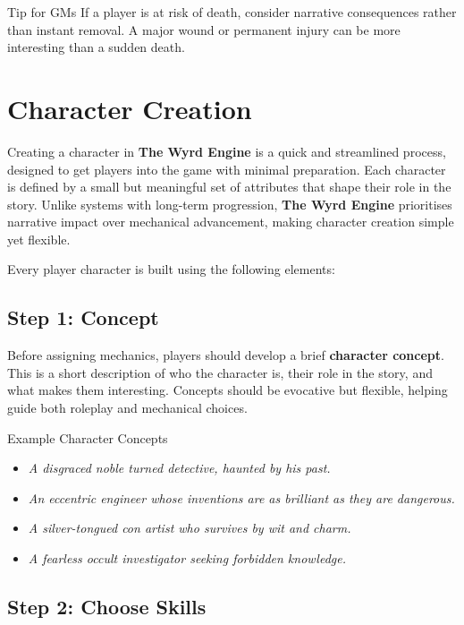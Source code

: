 \begin{DndComment}{Tip for GMs}
If a player is at risk of death, consider narrative consequences rather than instant removal. A major wound or permanent injury can be more interesting than a sudden death.
\end{DndComment}


\section{Character Creation}

Creating a character in \textbf{The Wyrd Engine} is a quick and streamlined process, designed to get players into the game with minimal preparation. Each character is defined by a small but meaningful set of attributes that shape their role in the story. Unlike systems with long-term progression, \textbf{The Wyrd Engine} prioritises narrative impact over mechanical advancement, making character creation simple yet flexible.

Every player character is built using the following elements:

\subsection{Step 1: Concept}

Before assigning mechanics, players should develop a brief \textbf{character concept}. This is a short description of who the character is, their role in the story, and what makes them interesting. Concepts should be evocative but flexible, helping guide both roleplay and mechanical choices.

\begin{DndSidebar}[float=!t]{Example Character Concepts}
    \begin{itemize}
        \item \emph{A disgraced noble turned detective, haunted by his past.}
        \item \emph{An eccentric engineer whose inventions are as brilliant as they are dangerous.}
        \item \emph{A silver-tongued con artist who survives by wit and charm.}
        \item \emph{A fearless occult investigator seeking forbidden knowledge.}
    \end{itemize}
\end{DndSidebar}

\subsection{Step 2: Choose Skills}

